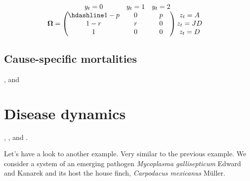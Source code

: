 \documentclass[
  12pt,
]{krantz}
\begin{document}
\[
\begin{matrix}
& \\
\mathbf{\Omega} =
  \left ( \vphantom{ \begin{matrix} 12 \\ 12 \\ 12\end{matrix} } \right .
          \end{matrix}
          \hspace{-1.2em}
          \begin{matrix}
          y_t=0 & y_t=1 & y_t=2 \\ \hdashline
          1 - p & 0 & p\\
          1 - r & r & 0\\
          1 & 0 & 0
          \end{matrix}
          \hspace{-0.2em}
          \begin{matrix}
          & \\
          \left . \vphantom{ \begin{matrix} 12 \\ 12 \\ 12 \end{matrix} } \right )
\begin{matrix}
z_{t}=A \\ z_{t}=JD \\ z_{t}=D
\end{matrix}
\end{matrix}
\]

\hypertarget{cause-specific-mortalities}{%
\subsection{Cause-specific mortalities}\label{cause-specific-mortalities}}

\citet{koons2014}, \citet{fernandez-chacon_causes_2016} and \citet{ruette_comparative_2015}

\hypertarget{disease-dynamics}{%
\section{Disease dynamics}\label{disease-dynamics}}

\citet{ConnCooch2009}, \citet{cooch2012disease}, \citet{MarescotEtAl2018} and \citet{santoro2014host}.

Let's have a look to another example. Very similar to the previous example. We consider a system of an emerging pathogen \emph{Mycoplasma gallisepticum} Edward and Kanarek and its host the house finch, \emph{Carpodacus mexicanus} Müller.
\end{document}

